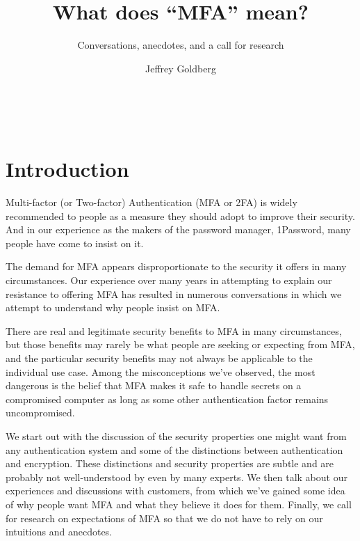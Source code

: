 \documentclass{soups}
\begin{document}
%


\title{What does ``MFA'' mean?}
\subtitle{Conversations, anecdotes, and a call for research}

\author{
  \alignauthor
  Jeffrey Goldberg\\
       \\
       \\
       \\
}


\maketitle
\begin{abstract}

 
\end{abstract}


\section{Introduction}
Multi-factor (or Two-factor) Authentication (MFA or 2FA) is widely recommended to people as a measure they should adopt to improve their security. And in our experience as the makers of the password manager, 1Password, many people have come to insist on it.

The demand for MFA appears disproportionate to the security it offers in many circumstances. Our experience over many years in attempting to explain our resistance to offering MFA has resulted in numerous conversations in which we attempt to understand why people insist on MFA\@.

There are real and legitimate security benefits to MFA in many circumstances, but those benefits may rarely be what people are seeking or expecting from MFA, and the particular security benefits may not always be applicable to the individual use case.
Among the misconceptions we've observed, the most dangerous is the belief that
MFA makes it safe to handle secrets on a compromised computer as long as some other authentication factor remains uncompromised.

We start out with the discussion of the security properties one might want from any authentication system and some of the distinctions between authentication and encryption.
These distinctions and security properties are subtle and are probably not well-understood by even by many experts. 
We then talk about our experiences and discussions with customers, from which we've gained some idea of why people want MFA and what they believe it does for them.
Finally, we call for research on expectations of MFA so that we do not have to rely on our intuitions and anecdotes.
\end{document}
